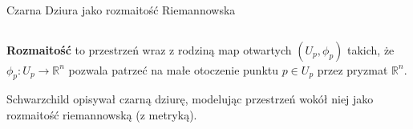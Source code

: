 \documentclass[polish, 9pt, xcolor=table, hyperref={pdfpagemode=FullScreen}]{beamer}
\newcommand{\R}{\mathbb{R}}
\begin{document}
\begin{frame}{Czarna Dziura jako rozmaitość Riemannowska}

  \begin{columns}
    \begin{column}{0.4\textwidth}

\textbf{Rozmaitość} to przestrzeń wraz z rodziną map otwartych $(U_p, \phi_p)$ takich, że $\phi_p:U_p\to \R^n$ pozwala patrzeć na małe otoczenie punktu $p\in U_p$ przez pryzmat $\R^n$.
\bigskip


Schwarzchild opisywał czarną dziurę, modelując przestrzeń wokół niej jako rozmaitość riemannowską (z metryką).
\end{column}


\end{columns}
\end{frame}
\end{document}
